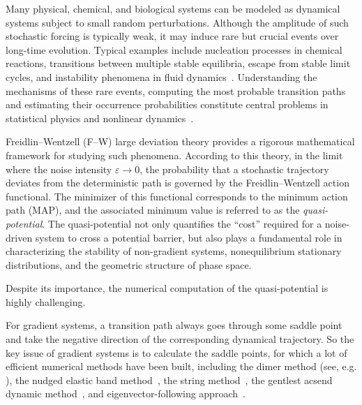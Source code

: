 \documentclass[a4paper,fleqn, 12pt]{cas-sc}
\numberwithin{table}{section}
\begin{document}
Many physical, chemical, and biological systems can be modeled as dynamical systems subject to small random perturbations. Although the amplitude of such stochastic forcing is typically weak, it may induce rare but crucial events over long-time evolution. Typical examples include nucleation processes in chemical reactions, transitions between multiple stable equilibria, escape from stable limit cycles, and instability phenomena in fluid dynamics~\cite{DellaBCC1998TransitionPath, BolhuCDG2002TransitionPath,e2005transition}. Understanding the mechanisms of these rare events, computing the most probable transition paths
and estimating their occurrence probabilities constitute central problems in statistical physics and nonlinear dynamics~\cite{EV2010TransitionpathTheory, GrafkSV2024SharpAsymptotic}.

Freidlin--Wentzell (F--W) large deviation theory \cite{freidlin_random_2012}
provides a rigorous mathematical framework for studying such phenomena. According to this theory, in the limit where the noise intensity $\varepsilon \to 0$, the probability that a stochastic trajectory deviates from the deterministic path is governed by the Freidlin--Wentzell action functional. The minimizer of this functional corresponds to the minimum action path (MAP), and the associated minimum value is referred to as the \emph{quasi-potential}. The quasi-potential not only quantifies the ``cost'' required for a noise-driven system to cross a potential barrier, but also plays a fundamental role in characterizing the stability of non-gradient systems, nonequilibrium stationary distributions, and the geometric structure of phase space.

Despite its importance, the numerical computation of the quasi-potential is highly challenging. 

For gradient systems, a transition path always goes through some saddle point and take the negative direction of the corresponding dynamical trajectory. So the key issue of gradient systems is to calculate the saddle points, for which a lot of efficient numerical methods have been built, including the dimer method (see, e.g. \cite{HenkeJ1999DimerMethod, ZhangDu2012ShrinkingDimer}), the nudged elastic band method~\cite{JonssMJ1998NudgedElastic,HenkeJ2000ImprovedTangent}, the string method~\cite{ERV2002StringMethod, ERV2007SimplifiedImproved, DuZhang2009ConstrainedString, ChengLEZS2010NucleationOrdered,RenV2013ClimbingString}, the gentlest acsend dynamic method~\cite{EZhou2011GentlestAscent, LiLuYang2015GentlestAscent,GuZhou2018SimplifiedGentlest}, and eigenvector-following approach~\cite{GaoLZ2015IterativeMinimization,GaoLZ2016IterativeMinimization, YinWCZZ2020ConstructionPathway, YinJSZZ2021TransitionPathways, SuWZZZ2025ImprovedHighIndex}.
\end{document}
